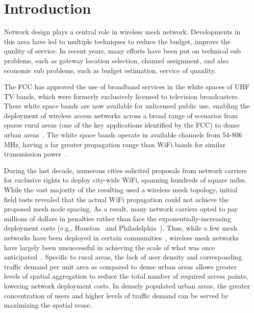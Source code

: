 \section{Introduction}
\label{sec:introduction}




Network design plays a central role in wireless mesh network. Developments in this
area have led to multiple techniques to reduce the budget, improve the qunlity of service.
In recent years, many efforts have been put on technical sub problems, such as 
gateway location selection, channel assignment, and also economic sub problems, 
such as budget estimation, service of quanlity.

The FCC has approved the use of broadband services in the white spaces of 
UHF TV bands, which were formerly exclusively licensed to television broadcasters.
These white space bands are now available for unlicensed public use, enabling the
deployment of wireless access networks across a broad range of scenarios from 
sparse rural areas (one of the key applications identified by the FCC) to dense urban 
areas~\cite{carlson}. The white space bands operate in available channels from 
54-806 MHz, having a far greater propagation range than WiFi bands for similar
transmission power~\cite{balanis2012antenna}. 

During the last decade, numerous cities solicited proposals from
network carriers for exclusive rights to deploy city-wide WiFi,
spanning hundreds of square miles. While the vast majority of the resulting used
a wireless mesh topology, initial field tests revealed that the 
actual WiFi propagation could not achieve the proposed mesh node
spacing. As a result, many network carriers opted to pay millions of 
dollars in penalties rather than face the exponentially-increasing
deployment costs (e.g., Houston~\cite{cnet_aug07} and 
Philadelphia~\cite{arstechnica_may08}). Thus, while a few mesh 
networks have been deployed in certain communities~\cite{CRSK06},
wireless mesh networks have largely been unsuccessful in achieving 
the scale of what was once anticipated~\cite{taps}.
Specific to rural areas, the lack of user density and corresponding traffic
demand per unit area as compared to dense urban areas allows greater levels of
spatial aggregation to reduce the total number of required access points, lowering
network deployment costs. In densely populated urban areas, the greater concentration
of users and higher levels of traffic demand can be served by maximizing the spatial
reuse. 

